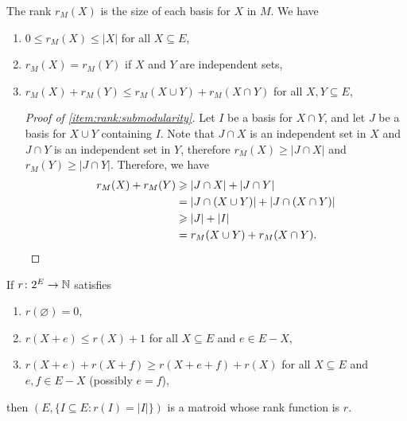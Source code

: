 The rank \(r_M(X)\) is the size of each basis for \(X\) in \(M\).
We have
\begin{enumerate}[label = \textup{(R\arabic*)}]
    \item \(0 \leq r_M(X) \leq |X|\) for all \(X \subseteq E\), \label{item:rank:bounded}
    \item \(r_M(X) = r_M(Y)\) if \(X\) and \(Y\) are independent sets, \label{item:rank:motonocity}
    \item \(r_M(X) + r_M(Y) \leq r_M(X \cup Y) + r_M(X \cap Y)\) for all \(X, Y \subseteq E\), \label{item:rank:submodularity}
    
    \begin{proof}[Proof of \ref{item:rank:submodularity}]
        Let \(I\) be a basis for \(X \cap Y\), and let \(J\) be a basis for \(X \cup Y\) containing \(I\).
        Note that \(J \cap X\) is an independent set in \(X\) and \(J \cap Y\) is an independent set in \(Y\),
        therefore \(r_M(X) \geq |J \cap X|\) and \(r_M(Y) \geq |J \cap Y|\).
        Therefore, we have
        \begin{align*}
            r_M(X) + r_M(Y) &\geq |J \cap X| + |J \cap Y| \\
            &= |J \cap (X \cup Y)| + |J \cap (X \cap Y)| \\
            &\geq |J| + |I| \\
            &= r_M(X \cup Y) + r_M(X \cap Y). \qedhere
        \end{align*}
    \end{proof}
\end{enumerate}

\begin{proposition} \label{prop:rank:newaxioms}
    If \(r \colon 2^E \to \nonnegatives\) satisfies
    \begin{enumerate}[label = \textup{(r\arabic*)}]
        \item \(r(\varnothing) = 0\), \label{item:rank:empty}
        \item \(r(X + e) \leq r(X) + 1\) for all \(X \subseteq E\) and \(e \in E - X\), \label{item:rank:step}
        \item \(r(X + e) + r(X + f) \geq  r(X + e + f) + r(X)\) for all \(X \subseteq E\) and \(e, f \in E - X\) (possibly \(e = f\)), \label{item:rank:submodularity2}
    \end{enumerate}
    then \((E, \{I \subseteq E : r(I) = |I|\})\) is a matroid whose rank function is \(r\).
\end{proposition}

